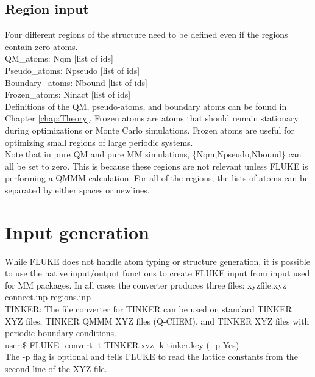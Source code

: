 \documentclass[12pt]{report}
\begin{document}
\subsection{Region input}

Four different regions of the structure need to be defined even if the
regions contain zero atoms. \\

QM\_atoms: Nqm [list of ids] \\
Pseudo\_atoms: Npseudo [list of ids] \\
Boundary\_atoms: Nbound [list of ids] \\
Frozen\_atoms: Ninact [list of ids] \\

Definitions of the QM, pseudo-atoms, and boundary atoms can be found in
Chapter \ref{chap:Theory}. Frozen atoms are atoms that should remain
stationary during optimizations or Monte Carlo simulations. Frozen atoms are
useful for optimizing small regions of large periodic systems. \\

Note that in pure QM and pure MM simulations, \{Nqm,Npseudo,Nbound\} can all
be set to zero. This is because these regions are not relevant unless FLUKE is
performing a QMMM calculation. For all of the regions, the lists of atoms can
be separated by either spaces or newlines.

\section{Input generation}

While FLUKE does not handle atom typing or structure generation, it is
possible to use the native input/output functions to create FLUKE input from
input used for MM packages. In all cases the converter produces three
files: xyzfile.xyz connect.inp regions.inp \\

TINKER: The file converter for TINKER can be used on standard
TINKER XYZ files, TINKER QMMM XYZ files (Q-CHEM), and TINKER XYZ files
with periodic boundary conditions. \\

user:\$ FLUKE -convert -t TINKER.xyz -k tinker.key ( -p Yes) \\

The -p flag is optional and tells FLUKE to read the lattice constants from
the second line of the XYZ file. \\
\end{document}
